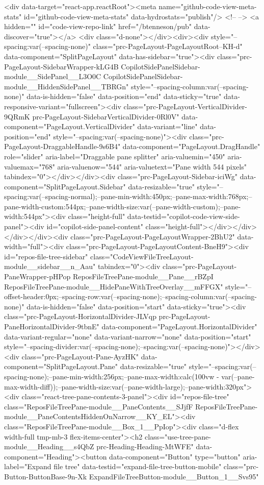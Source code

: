 {{{{{{{  <div data-target="react-app.reactRoot"><meta name="github-code-view-meta-stats" id="github-code-view-meta-stats" data-hydrostats="publish"/> <!-- --> <a hidden="" id="code-view-repo-link" href="/btenneson/pub" data-discover="true"></a> <div class="d-none"></div><div><div style="--spacing:var(--spacing-none)" class="prc-PageLayout-PageLayoutRoot--KH-d" data-component="SplitPageLayout" data-has-sidebar="true"><div class="prc-PageLayout-SidebarWrapper-kLG4B CopilotSidePanelSidebar-module__SidePanel__L3O0C CopilotSidePanelSidebar-module__HiddenSidePanel__TBRGn" style="--spacing-column:var(--spacing-none)" data-is-hidden="false" data-position="end" data-sticky="true" data-responsive-variant="fullscreen"><div class="prc-PageLayout-VerticalDivider-9QRmK prc-PageLayout-SidebarVerticalDivider-0Rl0V" data-component="PageLayout.VerticalDivider" data-variant="line" data-position="end" style="--spacing:var(--spacing-none)"><div class="prc-PageLayout-DraggableHandle-9s6B4" data-component="PageLayout.DragHandle" role="slider" aria-label="Draggable pane splitter" aria-valuemin="450" aria-valuemax="768" aria-valuenow="544" aria-valuetext="Pane width 544 pixels" tabindex="0"></div></div><div class="prc-PageLayout-Sidebar-iciWg" data-component="SplitPageLayout.Sidebar" data-resizable="true" style="--spacing:var(--spacing-normal);--pane-min-width:450px;--pane-max-width:768px;--pane-width-custom:544px;--pane-width-size:var(--pane-width-custom);--pane-width:544px"><div class="height-full" data-testid="copilot-code-view-side-panel"><div id="copilot-side-panel-content" class="height-full"></div></div></div></div><div class="prc-PageLayout-PageLayoutWrapper-2BhU2" data-width="full"><div class="prc-PageLayout-PageLayoutContent-BneH9"><div id="repos-file-tree-sidebar" class="CodeViewFileTreeLayout-module__sidebar__n_Aau" tabindex="0"><div class="prc-PageLayout-PaneWrapper-pHPop ReposFileTreePane-module__Pane__rBZpI ReposFileTreePane-module__HidePaneWithTreeOverlay__mFFGX" style="--offset-header:0px;--spacing-row:var(--spacing-none);--spacing-column:var(--spacing-none)" data-is-hidden="false" data-position="start" data-sticky="true"><div class="prc-PageLayout-HorizontalDivider-JLVqp prc-PageLayout-PaneHorizontalDivider-9tbnE" data-component="PageLayout.HorizontalDivider" data-variant-regular="none" data-variant-narrow="none" data-position="start" style="--spacing-divider:var(--spacing-none);--spacing:var(--spacing-none)"></div><div class="prc-PageLayout-Pane-AyzHK" data-component="SplitPageLayout.Pane" data-resizable="true" style="--spacing:var(--spacing-none);--pane-min-width:256px;--pane-max-width:calc(100vw - var(--pane-max-width-diff));--pane-width-size:var(--pane-width-large);--pane-width:320px"><div class="react-tree-pane-contents-3-panel"><div id="repos-file-tree" class="ReposFileTreePane-module__PaneContents__SJjfF ReposFileTreePane-module__PaneContentsHiddenOnNarrow__KY_EL"><div class="ReposFileTreePane-module__Box_1__PpIop"><div class="d-flex width-full tmp-mb-3 flex-items-center"><h2 class="use-tree-pane-module__Heading__s4QbZ prc-Heading-Heading-MtWFE" data-component="Heading"><button data-component="Button" type="button" aria-label="Expand file tree" data-testid="expand-file-tree-button-mobile" class="prc-Button-ButtonBase-9n-Xk ExpandFileTreeButton-module__Button_1__Svs95" }}}}}}}
